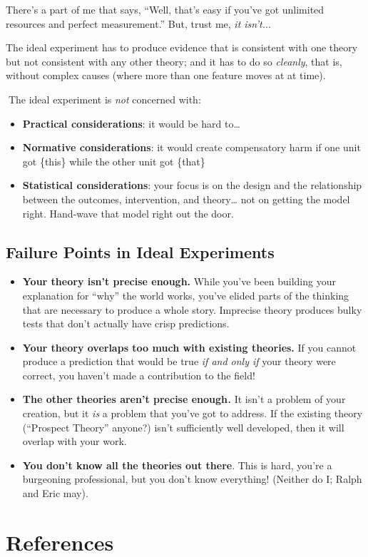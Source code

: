 \documentclass[
  letterpaper,
  DIV=11,
  numbers=noendperiod]{scrreprt}
\newlength{\cslhangindent}
\newenvironment{CSLReferences}[2] %
 {\begin{list}{}{%
  \setlength{\itemindent}{0pt}
  \setlength{\leftmargin}{0pt}
  \setlength{\parsep}{0pt}
  \ifodd #1
   \setlength{\leftmargin}{\cslhangindent}
   \setlength{\itemindent}{-1\cslhangindent}
  \fi
  \setlength{\itemsep}{#2\baselineskip}}}
 {\end{list}}
\begin{document}
There's a part of me that says, ``Well, that's easy if you've got
unlimited resources and perfect measurement.'' But, trust me, \emph{it
isn't.}..

The ideal experiment has to produce evidence that is consistent with one
theory but not consistent with any other theory; and it has to do so
\emph{cleanly}, that is, without complex causes (where more than one
feature moves at at time).

🙅The ideal experiment is \emph{not} concerned with: 🙅

\begin{itemize}
\item
  \textbf{Practical considerations}: it would be hard to\ldots{}
\item
  \textbf{Normative considerations}: it would create compensatory harm
  if one unit got \{this\} while the other unit got \{that\}
\item
  \textbf{Statistical considerations}: your focus is on the design and
  the relationship between the outcomes, intervention, and
  theory\ldots{} not on getting the model right. Hand-wave that model
  right out the door.
\end{itemize}

\section{Failure Points in Ideal
Experiments}\label{failure-points-in-ideal-experiments}

\begin{itemize}
\item
  \textbf{Your theory isn't precise enough.} While you've been building
  your explanation for ``why'' the world works, you've elided parts of
  the thinking that are necessary to produce a whole story. Imprecise
  theory produces bulky tests that don't actually have crisp
  predictions.
\item
  \textbf{Your theory overlaps too much with existing theories.} If you
  cannot produce a prediction that would be true \emph{if and only if}
  your theory were correct, you haven't made a contribution to the
  field!
\item
  \textbf{The other theories aren't precise enough\emph{.}} It isn't a
  problem of your creation, but it \emph{is} a problem that you've got
  to address. If the existing theory (``Prospect Theory'' anyone?) isn't
  sufficiently well developed, then it will overlap with your work.
\item
  \textbf{You don't know all the theories out there}. This is hard,
  you're a burgeoning professional, but you don't know everything!
  (Neither do I; Ralph and Eric may).
\end{itemize}


\chapter*{References}\label{references}


\label{refs}
\begin{CSLReferences}{0}{1}
\end{CSLReferences}
\end{document}
